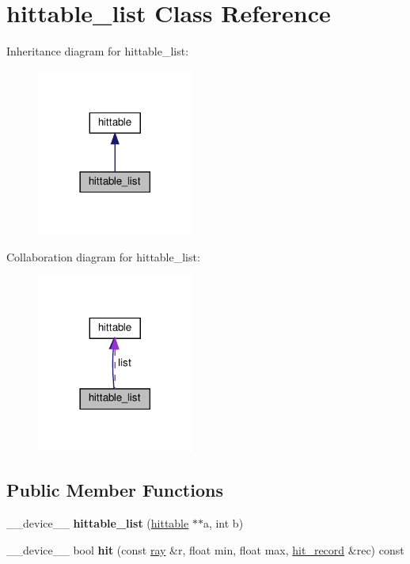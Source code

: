 \hypertarget{classhittable__list}{}\section{hittable\+\_\+list Class Reference}
\label{classhittable__list}


Inheritance diagram for hittable\+\_\+list\+:
\nopagebreak
\begin{figure}[H]
\begin{center}
\leavevmode
\includegraphics[width=146pt]{classhittable__list__inherit__graph}
\end{center}
\end{figure}


Collaboration diagram for hittable\+\_\+list\+:
\nopagebreak
\begin{figure}[H]
\begin{center}
\leavevmode
\includegraphics[width=146pt]{classhittable__list__coll__graph}
\end{center}
\end{figure}
\subsection*{Public Member Functions}
\begin{DoxyCompactItemize}
\item 
\mbox{\label{classhittable__list_a8f3a3cfa10a2e0b9aa2619d5a5118a61}} 
\+\_\+\+\_\+device\+\_\+\+\_\+ {\bfseries hittable\+\_\+list} (\hyperlink{classhittable}{hittable} $\ast$$\ast$a, int b)
\item 
\mbox{\label{classhittable__list_a9e03abf8064faef066a3abb312955871}} 
\+\_\+\+\_\+device\+\_\+\+\_\+ bool {\bfseries hit} (const \hyperlink{classray}{ray} \&r, float min, float max, \hyperlink{structhit__record}{hit\+\_\+record} \&rec) const
\end{DoxyCompactItemize}
